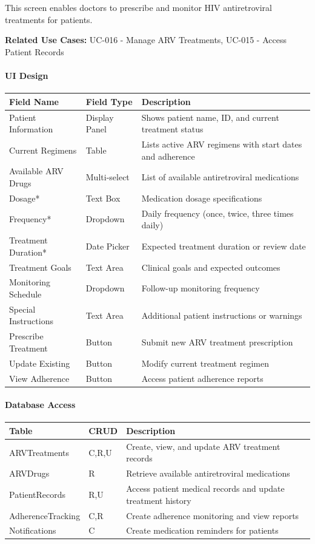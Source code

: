 \documentclass[12pt,a4paper]{article}
\begin{document}
This screen enables doctors to prescribe and monitor HIV antiretroviral treatments for patients.

\textbf{Related Use Cases:} UC-016 - Manage ARV Treatments, UC-015 - Access Patient Records

\paragraph{UI Design}

\begin{longtable}{|p{3cm}|p{3cm}|p{8cm}|}
\hline
\textbf{Field Name} & \textbf{Field Type} & \textbf{Description} \\
\hline
Patient Information & Display Panel & Shows patient name, ID, and current treatment status \\
\hline
Current Regimens & Table & Lists active ARV regimens with start dates and adherence \\
\hline
Available ARV Drugs & Multi-select & List of available antiretroviral medications \\
\hline
Dosage* & Text Box & Medication dosage specifications \\
\hline
Frequency* & Dropdown & Daily frequency (once, twice, three times daily) \\
\hline
Treatment Duration* & Date Picker & Expected treatment duration or review date \\
\hline
Treatment Goals & Text Area & Clinical goals and expected outcomes \\
\hline
Monitoring Schedule & Dropdown & Follow-up monitoring frequency \\
\hline
Special Instructions & Text Area & Additional patient instructions or warnings \\
\hline
Prescribe Treatment & Button & Submit new ARV treatment prescription \\
\hline
Update Existing & Button & Modify current treatment regimen \\
\hline
View Adherence & Button & Access patient adherence reports \\
\hline
\end{longtable}

\paragraph{Database Access}

\begin{longtable}{|p{3cm}|p{2cm}|p{9cm}|}
\hline
\textbf{Table} & \textbf{CRUD} & \textbf{Description} \\
\hline
ARVTreatments & C,R,U & Create, view, and update ARV treatment records \\
\hline
ARVDrugs & R & Retrieve available antiretroviral medications \\
\hline
PatientRecords & R,U & Access patient medical records and update treatment history \\
\hline
AdherenceTracking & C,R & Create adherence monitoring and view reports \\
\hline
Notifications & C & Create medication reminders for patients \\
\hline
\end{longtable}
\end{document}
